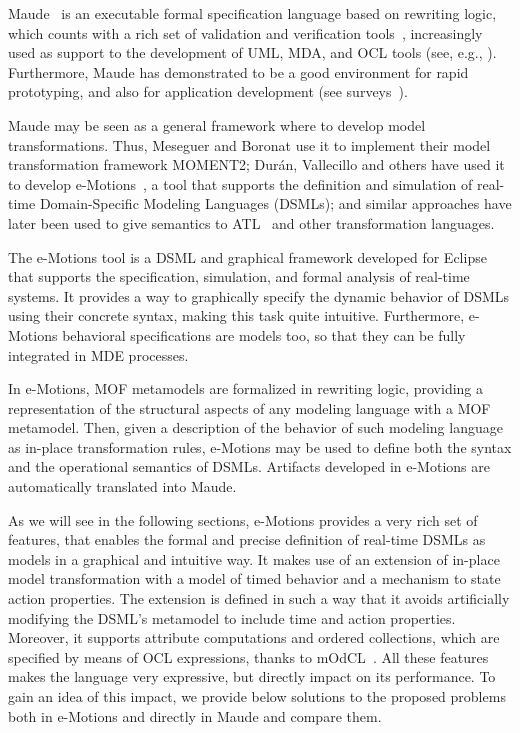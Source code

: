 
Maude~\cite{CDELMMQ:2002,CDELMMT:2007-book} is an executable formal specification language based on rewriting logic, which counts with a rich set of validation and verification tools~\cite{CDELMMT:2007-book,CDHLMO:2007}, increasingly used as support to the development of UML, MDA, and OCL tools (see, e.g., \cite{Boronat-Meseguer:08,RRDV:07-jot,Clavel-Egea:06}). Furthermore, Maude has demonstrated to be a good environment for rapid prototyping, and also for application development (see surveys~\cite{CDELMMT:2007-book,Meseguer:2012}). 

Maude may be seen as a general framework where to develop model transformations. Thus, Meseguer and Boronat use it to implement their model transformation framework MOMENT2; Dur\'an, Vallecillo and others have used it to develop e-Motions~\cite{RiveraDV10}, a tool that supports the definition and simulation of real-time Domain-Specific Modeling Languages (DSMLs); and similar approaches have later been used to give semantics to ATL~\cite{TroyaV10} and other transformation languages. 

The e-Motions tool is a DSML and graphical framework developed for Eclipse that supports the specification, simulation, and formal analysis of real-time systems. It provides a way to graphically specify the dynamic behavior of DSMLs using their concrete syntax, making this task quite intuitive. Furthermore, e-Motions behavioral specifications are models too, so that they can be fully integrated in MDE processes.

In e-Motions, MOF metamodels are formalized in rewriting logic, providing a representation of the structural aspects of any modeling language with a MOF metamodel. Then, given a description of the behavior of such modeling language as in-place transformation rules, e-Motions may be used to define both the syntax and the operational semantics of DSMLs. Artifacts developed in e-Motions are automatically translated into Maude.

As we will see in the following sections, e-Motions provides a very rich set of features, that enables the formal and precise definition of real-time DSMLs as models in a graphical and intuitive way. It makes use of an extension of in-place model transformation with a model of timed behavior and a mechanism to state action properties. The extension is defined in such a way that it avoids artificially modifying the DSML's metamodel to include time and action properties. Moreover, it supports attribute computations and ordered collections, which are specified by means of OCL
expressions, thanks to mOdCL~\cite{Roldan-Duran:2008-tr}. All these features makes the language very expressive, but directly impact on its performance. To gain an idea of this impact, we provide below solutions to the proposed problems both in e-Motions and directly in Maude and compare them. 

